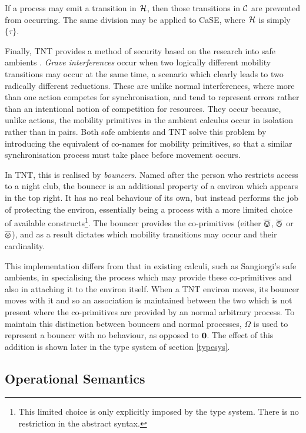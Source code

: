 \documentclass[orivec]{llncs}
\begin{document}
If a process may emit a transition in $\text{$\mathcal{H}$}$, then those transitions
in $\text{$\mathcal{C}$}$ are prevented from occurring.  The same division may be
applied to CaSE, where $\text{$\mathcal{H}$}$ is simply $\{ \tau \}$.

Finally, TNT provides a method of security based on the research into
safe ambients \cite{sangiorgi:mobsafeambients}.  \emph{Grave
interferences} occur when two logically different mobility transitions may
occur at the same time, a scenario which clearly leads to two radically
different reductions.  These are unlike normal interferences, where more
than one action competes for synchronisation, and tend to represent
errors rather than an intentional notion of competition for resources.
They occur because, unlike actions, the mobility primitives in the
ambient calculus occur in isolation rather than in pairs.  Both safe
ambients and TNT solve this problem by introducing the equivalent of
co-names for mobility primitives, so that a similar synchronisation
process must take place before movement occurs.

In TNT, this is realised by \emph{bouncers}.  Named after the person who
restricts access to a night club, the bouncer is an additional property
of a environ which appears in the top right.  It has no real behaviour
of its own, but instead performs the job of protecting the environ,
essentially being a process with a more limited choice of available
constructs\footnote{This limited choice is only explicitly imposed by
the type system.  There is no restriction in the abstract syntax.}.  The
bouncer provides the co-primitives (either $\overline{\varovee}$, $\overline{\varowedge}$ or $\overline{\varoast}$),
and as a result dictates which mobility transitions may occur and their
cardinality.

This implementation differs from that in existing calculi, such as
Sangiorgi's safe ambients, in specialising the process which may provide
these co-primitives and also in attaching it to the environ itself.
When a TNT environ moves, its bouncer moves with it and so an
association is maintained between the two which is not present where the
co-primitives are provided by an normal arbitrary process.  To maintain
this distinction between bouncers and normal processes, $\Omega$ is used
to represent a bouncer with no behaviour, as opposed to $\textbf{0}$.  The
effect of this addition is shown later in the type system of section
\ref{typesys}.

\subsection{Operational Semantics}
\end{document}

